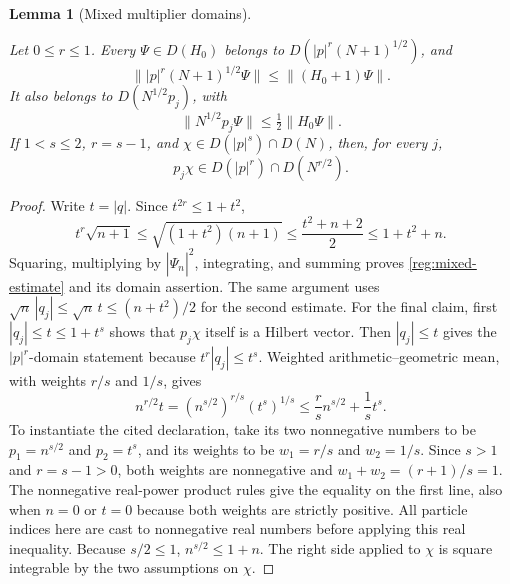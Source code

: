 \documentclass[11pt,a4paper]{article}
\newtheorem{lemma}[theorem]{Lemma}
\theoremstyle{definition}
\theoremstyle{remark}
\newcommand{\proofid}[1]{\par\smallskip{\normalfont\scriptsize\color{inkblue}Stable ID: \nolinkurl{#1}}\par\smallskip}
\begin{document}
\begin{lemma}[Mixed multiplier domains]
\label{reg:mixed-domains}
\proofid{reg:mixed-domains}
\par{}\par\smallskip

Let \(0\leq r\leq1\).  Every \(\Psi\in D(H_0)\) belongs to
\(D(|p|^r(N+1)^{1/2})\), and
\begin{equation}
 \||p|^r(N+1)^{1/2}\Psi\|\leq\|(H_0+1)\Psi\|.
 \label{reg:mixed-estimate}
\end{equation}
It also belongs to \(D(N^{1/2}p_j)\), with
\[
 \|N^{1/2}p_j\Psi\|\leq\tfrac12\|H_0\Psi\|.
\]
If \(1<s\leq2\), \(r=s-1\), and
\(\chi\in D(|p|^s)\cap D(N)\), then, for every \(j\),
\begin{equation}
 p_j\chi\in D(|p|^r)\cap D(N^{r/2}).
 \label{reg:mixed-transfer}
\end{equation}
\end{lemma}
\begin{proof}
Write \(t=|q|\).  Since \(t^{2r}\leq1+t^2\),
\[
 t^r\sqrt{n+1}\leq\sqrt{(1+t^2)(n+1)}
 \leq\frac{t^2+n+2}{2}\leq1+t^2+n.
\]
Squaring, multiplying by \(|\widehat\Psi_n|^2\), integrating, and summing
proves \eqref{reg:mixed-estimate} and its domain assertion.  The same
argument uses \(\sqrt n\,|q_j|\leq\sqrt n\,t\leq(n+t^2)/2\) for the
second estimate. For the final claim, first
\(|q_j|\leq t\leq1+t^s\) shows that \(p_j\chi\) itself is a
Hilbert vector. Then \(|q_j|\leq t\) gives the
\(|p|^r\)-domain statement because \(t^r|q_j|\leq t^s\).  Weighted
arithmetic--geometric mean, with weights \(r/s\) and \(1/s\), gives
\[
 n^{r/2}t
 =(n^{s/2})^{r/s}(t^s)^{1/s}
 \leq\frac r s n^{s/2}+\frac1s t^s.
\]
To instantiate the cited declaration, take its two nonnegative
numbers to be $p_1=n^{s/2}$ and $p_2=t^s$, and its weights to be
$w_1=r/s$ and $w_2=1/s$. Since $s>1$ and $r=s-1>0$, both
weights are nonnegative and $w_1+w_2=(r+1)/s=1$.
The nonnegative real-power product rules give the equality on
the first line, also when $n=0$ or $t=0$ because both weights
are strictly positive. All particle indices here are cast to
nonnegative real numbers before applying this real inequality.
Because \(s/2\leq1\), \(n^{s/2}\leq1+n\).  The right side applied to
\(\chi\) is square integrable by the two assumptions on \(\chi\).
\end{proof}
\end{document}
